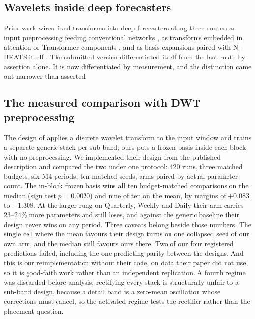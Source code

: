 \subsection{Wavelets inside deep forecasters}
\label{sec:related:waveletml}

Prior work wires fixed transforms into deep forecasters along three
routes: as input preprocessing feeding conventional networks
\citep{deznabi2023multiwave}, as transforms embedded in attention or
Transformer components \citep{sasal2022wtransformers, zhou2025wavets},
and as basis expansions paired with N-BEATS itself
\citep{pramanick2024fusion}. The submitted version differentiated itself
from the last route by assertion alone. It is now differentiated by
measurement, and the distinction came out narrower than asserted.

\subsection{The measured comparison with DWT preprocessing}
\label{sec:related:pramanick}

The design of \citet{pramanick2024fusion} applies a discrete wavelet
transform to the input window and trains a separate generic stack per
sub-band; ours puts a frozen basis inside each block with no
preprocessing. We implemented their design from the published
description and compared the two under one protocol: 420 runs, three
matched budgets, six M4 periods, ten matched seeds, arms paired by
actual parameter count. The in-block frozen basis wins all ten
budget-matched comparisons on the median (sign test $p = 0.0020$) and
nine of ten on the mean, by margins of $+0.083$ to $+1.308$. At the
larger rung on Quarterly, Weekly and Daily their arm carries 23--24\%
more parameters and still loses, and against the generic baseline their
design never wins on any period. Three caveats belong beside those
numbers. The single cell where the mean favours their design turns on
one collapsed seed of our own arm, and the median still favours ours
there. Two of our four registered predictions failed, including the one
predicting parity between the designs. And this is our reimplementation
without their code, on data their paper did not use, so it is good-faith
work rather than an independent replication. A fourth regime was
discarded before analysis: rectifying every stack is structurally unfair
to a sub-band design, because a detail band is a zero-mean oscillation
whose corrections must cancel, so the activated regime tests the
rectifier rather than the placement question.

